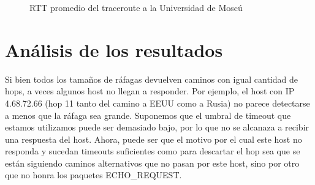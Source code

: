 \begin{figure}[H]
  \centering
  \caption{RTT promedio del traceroute a la Universidad de Moscú}
  \label{rusiaTTL}
\end{figure}


\section{Análisis de los resultados}

Si bien todos los tamaños de ráfagas devuelven caminos con igual cantidad de hops, a veces algunos host no llegan a responder. Por ejemplo, el host con IP 4.68.72.66 (hop 11 tanto del camino a EEUU como a Rusia) no parece detectarse a menos que la ráfaga sea grande. Suponemos que el umbral de timeout que estamos utilizamos puede ser demasiado bajo, por lo que no se alcanaza a recibir una respuesta del host. Ahora, puede ser que el motivo por el cual este host no responda y sucedan timeouts suficientes como para descartar el hop sea que se están siguiendo caminos alternativos que no pasan por este host, sino por otro que no honra los paquetes ECHO\_REQUEST. 

